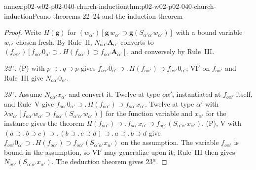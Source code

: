 \begin{annexitem}{annex:p02-w02-p02-040-church-induction}{thm:p02-w02-p02-040-church-induction}{Peano theorems 22--24 and the induction theorem}
\begin{proof}
Write \(H(\mathbf g)\) for
\((w_{\alpha'})[\mathbf g\,w_{\alpha'}\supset\mathbf g(S_{\alpha'\alpha'}w_{\alpha'})]\)
with a bound variable \(w_{\alpha'}\) chosen fresh.  By Rule~II,
\(N_{o\alpha'}\mathbf A_{\alpha'}\) converts to
\((f_{o\alpha'})[f_{o\alpha'}0_{\alpha'}\supset.\,H(f_{o\alpha'})\supset f_{o\alpha'}\mathbf A_{\alpha'}]\),
and conversely by Rule~III.

\emph{22\(^\alpha\).}  (P) with \(p\supset.\,q\supset p\) gives
\(f_{o\alpha'}0_{\alpha'}\supset.\,H(f_{o\alpha'})\supset f_{o\alpha'}0_{\alpha'}\);
VI\('\) on \(f_{o\alpha'}\) and Rule~III give \(N_{o\alpha'}0_{\alpha'}\).

\emph{23\(^\alpha\).}  Assume \(N_{o\alpha'}x_{\alpha'}\) and convert it.
Twelve at type \(o\alpha'\), instantiated at \(f_{o\alpha'}\) itself, and
Rule~V give
\(f_{o\alpha'}0_{\alpha'}\supset.\,H(f_{o\alpha'})\supset f_{o\alpha'}x_{\alpha'}\).
Twelve at type \(\alpha'\) with
\(\lambda w_{\alpha'}[f_{o\alpha'}w_{\alpha'}\supset f_{o\alpha'}(S_{\alpha'\alpha'}w_{\alpha'})]\)
for the function variable and \(x_{\alpha'}\) for the instance gives the
theorem
\(H(f_{o\alpha'})\supset.\,f_{o\alpha'}x_{\alpha'}\supset f_{o\alpha'}(S_{\alpha'\alpha'}x_{\alpha'})\).
(P), V with
\((a\supset.\,b\supset c)\supset.\,(b\supset.\,c\supset d)\supset.\,a\supset.\,b\supset d\)
give
\(f_{o\alpha'}0_{\alpha'}\supset.\,H(f_{o\alpha'})\supset f_{o\alpha'}(S_{\alpha'\alpha'}x_{\alpha'})\)
on the assumption.  The variable \(f_{o\alpha'}\) is bound in the
assumption, so VI\('\) may generalize upon it; Rule~III then gives
\(N_{o\alpha'}(S_{\alpha'\alpha'}x_{\alpha'})\).  The deduction theorem gives
23\(^\alpha\).


\end{proof}
\end{annexitem}
